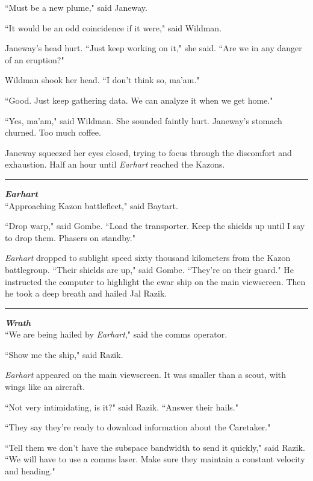 \documentclass[twoside,letterpaper,12pt]{memoir}
\begin{document}
``Must be a new plume," said Janeway.

``It would be an odd coincidence if it were," said Wildman.

Janeway's head hurt. ``Just keep working on it," she said. ``Are we in any danger of an eruption?"

Wildman shook her head. ``I don't think so, ma'am."

``Good. Just keep gathering data. We can analyze it when we get home."

``Yes, ma'am," said Wildman. She sounded faintly hurt. Janeway's stomach churned. Too much coffee.

Janeway squeezed her eyes closed, trying to focus through the discomfort and exhaustion. Half an hour until \textit{Earhart} reached the Kazons.

\begin{center}\rule{3cm}{0.4 pt}\end{center}

\noindent\textit{\textbf{Earhart}}\\

``Approaching Kazon battlefleet," said Baytart.

``Drop warp," said Gombe. ``Load the transporter. Keep the shields up until I say to drop them. Phasers on standby."

\textit{Earhart} dropped to sublight speed sixty thousand kilometers from the Kazon battlegroup. ``Their shields are up," said Gombe. ``They're on their guard." He instructed the computer to highlight the ewar ship on the main viewscreen. Then he took a deep breath and hailed Jal Razik.

\begin{center}\rule{3cm}{0.4 pt}\end{center}

\noindent\textit{\textbf{Wrath}}\\

``We are being hailed by \textit{Earhart}," said the comms operator.

``Show me the ship," said Razik.

\textit{Earhart} appeared on the main viewscreen. It was smaller than a scout, with wings like an aircraft.

``Not very intimidating, is it?" said Razik. ``Answer their hails."

``They say they're ready to download information about the Caretaker."

``Tell them we don't have the subspace bandwidth to send it quickly," said Razik. ``We will have to use a comms laser. Make sure they maintain a constant velocity and heading."
\end{document}
